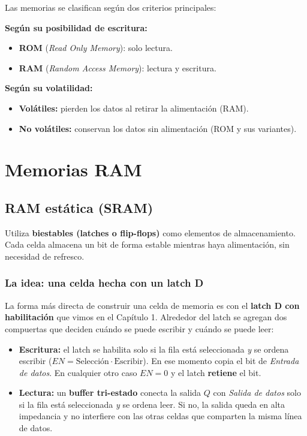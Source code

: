 Las memorias se clasifican según dos criterios principales:

\textbf{Según su posibilidad de escritura:}
\begin{itemize}
  \item \textbf{ROM} (\textit{Read Only Memory}): solo lectura.
  \item \textbf{RAM} (\textit{Random Access Memory}): lectura y escritura.
\end{itemize}

\textbf{Según su volatilidad:}
\begin{itemize}
  \item \textbf{Volátiles:} pierden los datos al retirar la alimentación (RAM).
  \item \textbf{No volátiles:} conservan los datos sin alimentación (ROM y sus variantes).
\end{itemize}


\section{Memorias RAM}

\subsection{RAM estática (SRAM)}

Utiliza \textbf{biestables (latches o flip-flops)} como elementos de almacenamiento. Cada celda almacena un bit de forma estable mientras haya alimentación, sin necesidad de refresco.

\subsubsection{La idea: una celda hecha con un latch D}

La forma más directa de construir una celda de memoria es con el \textbf{latch D con habilitación} que vimos en el Capítulo 1. Alrededor del latch se agregan dos compuertas que deciden cuándo se puede escribir y cuándo se puede leer:

\begin{itemize}
  \item \textbf{Escritura:} el latch se habilita solo si la fila está seleccionada \emph{y} se ordena escribir ($EN = \text{Selección} \cdot \text{Escribir}$). En ese momento copia el bit de \emph{Entrada de datos}. En cualquier otro caso $EN = 0$ y el latch \textbf{retiene} el bit.
  \item \textbf{Lectura:} un \textbf{buffer tri-estado} conecta la salida $Q$ con \emph{Salida de datos} solo si la fila está seleccionada \emph{y} se ordena leer. Si no, la salida queda en alta impedancia y no interfiere con las otras celdas que comparten la misma línea de datos.
\end{itemize}

